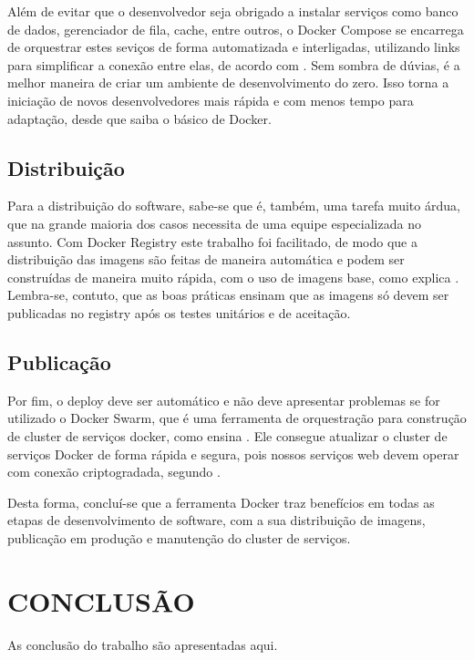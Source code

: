 \documentclass[
	12pt,				%
	openright,			%
	oneside,			%
	a4paper,			%
	chapter=TITLE,		%
	section=TITLE,		%
	english,			%
	french,				%
	spanish,			%
	brazil				%
	]{abntex2}
\begin{document}
Além de evitar que o desenvolvedor seja obrigado a instalar serviços como banco de dados, gerenciador de fila, cache, entre outros, o Docker Compose se encarrega de orquestrar estes seviços de forma automatizada e interligadas, utilizando links para simplificar a conexão entre elas, de acordo com . Sem sombra de dúvias, é a melhor maneira de criar um ambiente de desenvolvimento do zero. Isso torna a iniciação de novos desenvolvedores mais rápida e com menos tempo para adaptação, desde que saiba o básico de Docker.

\section{Distribuição}

Para a distribuição do software, sabe-se que é, também, uma tarefa muito árdua, que na grande maioria dos casos necessita de uma equipe especializada no assunto. Com Docker Registry este trabalho foi facilitado, de modo que a distribuição das imagens são feitas de maneira automática e podem ser construídas de maneira muito rápida, com o uso de imagens base, como explica . Lembra-se, contuto, que as boas práticas ensinam que as imagens só devem ser publicadas no registry após os testes unitários e de aceitação.

\section{Publicação}

Por fim, o deploy deve ser automático e não deve apresentar problemas se for utilizado o Docker Swarm, que é uma ferramenta de orquestração para construção de cluster de serviços docker, como ensina . Ele consegue atualizar o cluster de serviços Docker de forma rápida e segura, pois nossos serviços web devem operar com conexão criptogradada, segundo .

Desta forma, concluí-se que a ferramenta Docker traz benefícios em todas as etapas de desenvolvimento de software, com a sua distribuição de imagens, publicação em produção e manutenção do cluster de serviços.

\chapter{CONCLUSÃO}

As conclusão do trabalho são apresentadas aqui.
\end{document}
